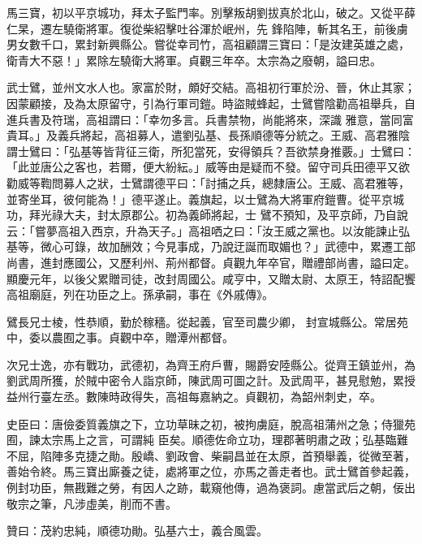 \begin{pinyinscope}
 馬三寶，初以平京城功，拜太子監門率。別擊叛胡劉拔真於北山，破之。又從平薛仁杲，遷左驍衛將軍。復從柴紹擊吐谷渾於岷州，先
 鋒陷陣，斬其名王，前後虜男女數千口，累封新興縣公。嘗從幸司竹，高祖顧謂三寶曰：「是汝建英雄之處，衛青大不惡！」累除左驍衛大將軍。貞觀三年卒。太宗為之廢朝，謚曰忠。



 武士鷿，並州文水人也。家富於財，頗好交結。高祖初行軍於汾、晉，休止其家；因蒙顧接，及為太原留守，引為行軍司鎧。時盜賊蜂起，士鷿嘗陰勸高祖舉兵，自進兵書及符瑞，高祖謂曰：「幸勿多言。兵書禁物，尚能將來，深識
 雅意，當同富貴耳。」及義兵將起，高祖募人，遣劉弘基、長孫順德等分統之。王威、高君雅陰謂士鷿曰：「弘基等皆背征三衛，所犯當死，安得領兵？吾欲禁身推覈。」士鷿曰：「此並唐公之客也，若爾，便大紛紜。」威等由是疑而不發。留守司兵田德平又欲勸威等鞫問募人之狀，士鷿謂德平曰：「討捕之兵，總隸唐公。王威、高君雅等，並寄坐耳，彼何能為！」德平遂止。義旗起，以士鷿為大將軍府鎧曹。從平京城功，拜光祿大夫，封太原郡公。初為義師將起，士
 鷿不預知，及平京師，乃自說云：「嘗夢高祖入西京，升為天子。」高祖哂之曰：「汝王威之黨也。以汝能諫止弘基等，微心可錄，故加酬效；今見事成，乃說迂誕而取媚也？」武德中，累遷工部尚書，進封應國公，又歷利州、荊州都督。貞觀九年卒官，贈禮部尚書，謚曰定。顯慶元年，以後父累贈司徒，改封周國公。咸亨中，又贈太尉、太原王，特詔配饗高祖廟庭，列在功臣之上。孫承嗣，事在《外戚傳》。



 鷿長兄士棱，性恭順，勤於稼穡。從起義，官至司農少卿，
 封宣城縣公。常居苑中，委以農囿之事。貞觀中卒，贈潭州都督。



 次兄士逸，亦有戰功，武德初，為齊王府戶曹，賜爵安陸縣公。從齊王鎮並州，為劉武周所獲，於賊中密令人詣京師，陳武周可圖之計。及武周平，甚見慰勉，累授益州行臺左丞。數陳時政得失，高祖每嘉納之。貞觀初，為韶州刺史，卒。



 史臣曰：唐儉委質義旗之下，立功草昧之初，被拘虜庭，脫高祖蒲州之急；侍獵苑囿，諫太宗馬上之言，可謂純
 臣矣。順德佐命立功，理郡著明肅之政；弘基臨難不屈，陷陣多克捷之勛。殷嶠、劉政會、柴嗣昌並在太原，首預舉義，從微至著，善始令終。馬三寶出廝養之徒，處將軍之位，亦馬之善走者也。武士鷿首參起義，例封功臣，無戡難之勞，有因人之跡，載窺他傳，過為褒詞。慮當武后之朝，佞出敬宗之筆，凡涉虛美，削而不書。



 贊曰：茂約忠純，順德功勛。弘基六士，義合風雲。



\end{pinyinscope}